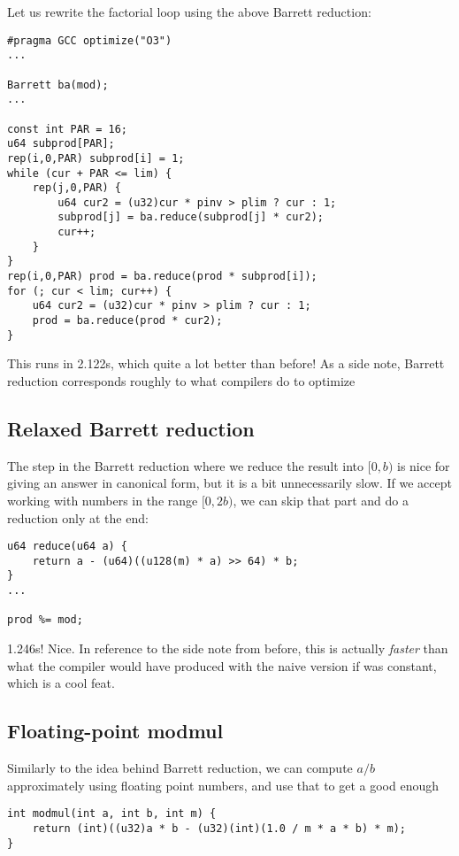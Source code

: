 \documentclass[openany]{book}
\begin{document}
Let us rewrite the factorial loop using the above Barrett reduction:
\begin{lstlisting}
#pragma GCC optimize("O3")
...

Barrett ba(mod);
...

const int PAR = 16;
u64 subprod[PAR];
rep(i,0,PAR) subprod[i] = 1;
while (cur + PAR <= lim) {
	rep(j,0,PAR) {
		u64 cur2 = (u32)cur * pinv > plim ? cur : 1;
		subprod[j] = ba.reduce(subprod[j] * cur2);
		cur++;
	}
}
rep(i,0,PAR) prod = ba.reduce(prod * subprod[i]);
for (; cur < lim; cur++) {
	u64 cur2 = (u32)cur * pinv > plim ? cur : 1;
	prod = ba.reduce(prod * cur2);
}
\end{lstlisting}
This runs in 2.122s, which quite a lot better than before!
As a side note, Barrett reduction corresponds roughly to what compilers do to optimize \verb@a % b@ where \verb@b@ is a compile-time constant.

\subsection*{Relaxed Barrett reduction}
The step in the Barrett reduction where we reduce the result into $[0, b)$ is nice for giving an answer in canonical form, but it is a bit unnecessarily slow.
If we accept working with numbers in the range $[0, 2b)$, we can skip that part and do a reduction only at the end:
\begin{lstlisting}
u64 reduce(u64 a) {
	return a - (u64)((u128(m) * a) >> 64) * b;
}
...

prod %= mod;
\end{lstlisting}
1.246s! Nice.
In reference to the side note from before, this is actually \emph{faster} than what the compiler would have produced with the naive version if \verb@mod@ was constant, which is a cool feat.

\subsection*{Floating-point modmul}

Similarly to the idea behind Barrett reduction, we can compute $a / b$ approximately using floating point numbers, and use that to get a good enough \verb@a % b@, in the range $(-(1+\epsilon)b, (1+\epsilon)b)$. We combine multiplication and reduction in order to keep to 32-bit integers, making use of integer overflow:

\begin{lstlisting}
int modmul(int a, int b, int m) {
	return (int)((u32)a * b - (u32)(int)(1.0 / m * a * b) * m);
}
\end{lstlisting}
\end{document}
